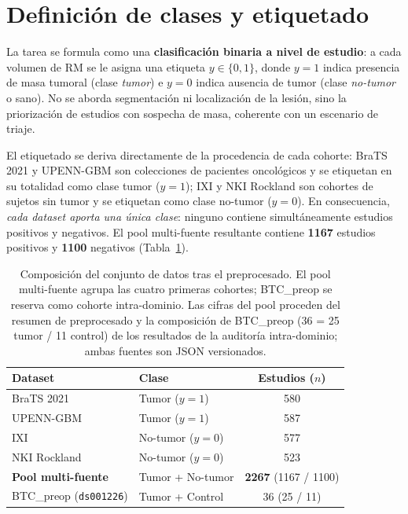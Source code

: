 \section{Definición de clases y etiquetado}

La tarea se formula como una \textbf{clasificación binaria a nivel de estudio}:
a cada volumen de RM se le asigna una etiqueta $y \in \{0, 1\}$, donde $y=1$
indica presencia de masa tumoral (clase \emph{tumor}) e $y=0$ indica ausencia
de tumor (clase \emph{no-tumor} o sano). No se aborda segmentación ni
localización de la lesión, sino la priorización de estudios con sospecha de
masa, coherente con un escenario de triaje.

El etiquetado se deriva directamente de la procedencia de cada cohorte: BraTS
2021 y UPENN-GBM son colecciones de pacientes oncológicos y se etiquetan en su
totalidad como clase tumor ($y=1$); IXI y NKI Rockland son cohortes de sujetos
sin tumor y se etiquetan como clase no-tumor ($y=0$). En consecuencia,
\emph{cada dataset aporta una única clase}: ninguno contiene simultáneamente
estudios positivos y negativos. El pool multi-fuente resultante contiene
\textbf{1167} estudios positivos y \textbf{1100} negativos (Tabla~\ref{tab:composicion}).

\begin{table}[ht]
  \centering
  \caption[Composición del conjunto de datos]{Composición del conjunto de datos tras el preprocesado. El pool
  multi-fuente agrupa las cuatro primeras cohortes; BTC\_preop se reserva como
  cohorte intra-dominio. Las cifras del pool proceden del resumen de
  preprocesado y la composición de BTC\_preop (36 = 25 tumor / 11 control) de
  los resultados de la auditoría intra-dominio; ambas fuentes son JSON
  versionados.}
  \label{tab:composicion}
  \begin{tabular}{l l c}
    \hline
    \textbf{Dataset} & \textbf{Clase} & \textbf{Estudios ($n$)} \\
    \hline
    BraTS 2021    & Tumor ($y=1$)    & 580 \\
    UPENN-GBM     & Tumor ($y=1$)    & 587 \\
    IXI           & No-tumor ($y=0$) & 577 \\
    NKI Rockland  & No-tumor ($y=0$) & 523 \\
    \hline
    \textbf{Pool multi-fuente} & Tumor + No-tumor & \textbf{2267} (1167 / 1100) \\
    \hline
    BTC\_preop (\texttt{ds001226}) & Tumor + Control & 36 (25 / 11) \\
    \hline
  \end{tabular}
\end{table}

